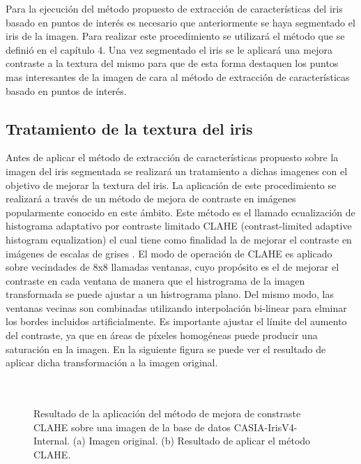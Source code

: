 Para la ejecución del método propuesto de extracción de características del iris basado en puntos de interés es necesario que anteriormente se haya segmentado el iris de la imagen. Para realizar este procedimiento se utilizará el método que se definió en el capítulo 4. Una vez segmentado el iris se le aplicará una mejora contraste a la textura del mismo para que de esta forma destaquen los puntos mas interesantes de la imagen de cara al método de extracción de características basado en puntos de interés. \\


\subsection{Tratamiento de la textura del iris}

Antes de aplicar el método de extracción de características propuesto sobre la imagen del iris segmentada se realizará un tratamiento a dichas imagenes con el objetivo de mejorar la textura del iris. La aplicación de este procedimiento se realizará a través de un método de mejora de contraste en imágenes popularmente conocido en este ámbito.  Este método es el llamado ecualización de histograma adaptativo por contraste limitado CLAHE (contrast-limited adaptive histogram equalization) el cual tiene como finalidad la de mejorar el contraste en imágenes de escalas de grises \cite{Reference22}.  El modo de operación de CLAHE es aplicado sobre vecindades de 8x8 llamadas ventanas, cuyo propósito es el de mejorar el contraste en cada ventana de manera que el histrograma de la imagen transformada se puede ajustar a un histrograma plano. Del mismo modo, las ventanas vecinas son combinadas utilizando interpolación bi-linear para elminar los bordes incluidos artificialmente. Es importante ajustar el límite del aumento del contraste, ya que en áreas de píxeles homogéneas puede producir una saturación en la imagen. En la siguiente figura se puede ver el resultado de aplicar dicha transformación a la imagen original.\\ \\ \\

\begin{figure}[htbp]
\centering
{}
\caption{Resultado de la aplicación del método de mejora de constraste CLAHE sobre una imagen de la base de datos CASIA-IrisV4-Internal. (a) Imagen original. (b) Resultado de aplicar el método CLAHE.} \label{fig:señales}
\end{figure}


